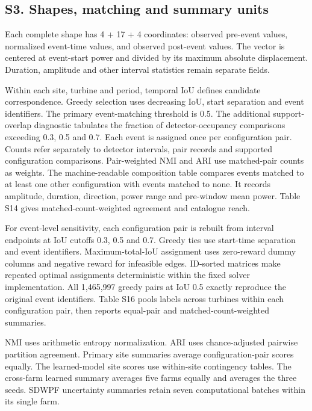 \documentclass[a4paper,11pt]{article}
\newcounter{none}
\begin{document}
\subsection{S3. Shapes, matching and summary units}\label{s3.-shapes-matching-and-summary-units}

Each complete shape has 4 + 17 + 4 coordinates: observed pre-event values, normalized event-time values, and observed post-event values. The vector is centered at event-start power and divided by its maximum absolute displacement. Duration, amplitude and other interval statistics remain separate fields.

Within each site, turbine and period, temporal IoU defines candidate correspondence. Greedy selection uses decreasing IoU, start separation and event identifiers. The primary event-matching threshold is 0.5. The additional support-overlap diagnostic tabulates the fraction of detector-occupancy comparisons exceeding 0.3, 0.5 and 0.7. Each event is assigned once per configuration pair. Counts refer separately to detector intervals, pair records and supported configuration comparisons. Pair-weighted NMI and ARI use matched-pair counts as weights. The machine-readable composition table compares events matched to at least one other configuration with events matched to none. It records amplitude, duration, direction, power range and pre-window mean power. Table S14 gives matched-count-weighted agreement and catalogue reach.

For event-level sensitivity, each configuration pair is rebuilt from interval endpoints at IoU cutoffs 0.3, 0.5 and 0.7. Greedy ties use start-time separation and event identifiers. Maximum-total-IoU assignment uses zero-reward dummy columns and negative reward for infeasible edges. ID-sorted matrices make repeated optimal assignments deterministic within the fixed solver implementation. All 1,465,997 greedy pairs at IoU 0.5 exactly reproduce the original event identifiers. Table S16 pools labels across turbines within each configuration pair, then reports equal-pair and matched-count-weighted summaries.

NMI uses arithmetic entropy normalization. ARI uses chance-adjusted pairwise partition agreement. Primary site summaries average configuration-pair scores equally. The learned-model site scores use within-site contingency tables. The cross-farm learned summary averages five farms equally and averages the three seeds. SDWPF uncertainty summaries retain seven computational batches within its single farm.
\end{document}
